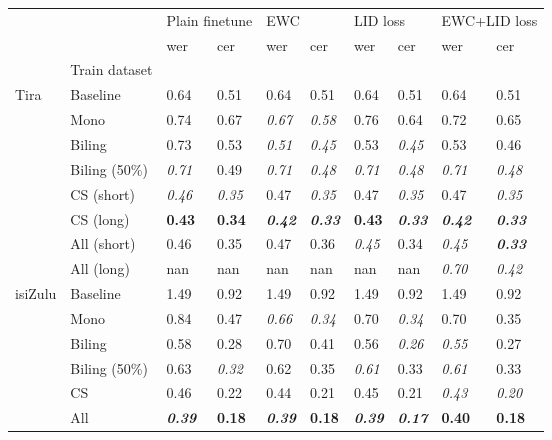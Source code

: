 \begin{tabular}{llllllllll}
\toprule
 &  & \multicolumn{2}{l}{Plain finetune} & \multicolumn{2}{l}{EWC} & \multicolumn{2}{l}{LID loss} & \multicolumn{2}{l}{EWC+LID loss} \\
 &  & wer & cer & wer & cer & wer & cer & wer & cer \\
 & Train dataset &  &  &  &  &  &  &  &  \\
\midrule
Tira & Baseline & 0.64 & 0.51 & 0.64 & 0.51 & 0.64 & 0.51 & 0.64 & 0.51 \\
 & Mono & 0.74 & 0.67 & \textit{0.67} & \textit{0.58} & 0.76 & 0.64 & 0.72 & 0.65 \\
 & Biling & 0.73 & 0.53 & \textit{0.51} & \textit{0.45} & 0.53 & \textit{0.45} & 0.53 & 0.46 \\
 & Biling (50\%) & \textit{0.71} & 0.49 & \textit{0.71} & \textit{0.48} & \textit{0.71} & \textit{0.48} & \textit{0.71} & \textit{0.48} \\
 & CS (short) & \textit{0.46} & \textit{0.35} & 0.47 & \textit{0.35} & 0.47 & \textit{0.35} & 0.47 & \textit{0.35} \\
 & CS (long) & \textbf{0.43} & \textbf{0.34} & \textit{\textbf{0.42}} & \textit{\textbf{0.33}} & \textbf{0.43} & \textit{\textbf{0.33}} & \textit{\textbf{0.42}} & \textit{\textbf{0.33}} \\
 & All (short) & 0.46 & 0.35 & 0.47 & 0.36 & \textit{0.45} & 0.34 & \textit{0.45} & \textit{\textbf{0.33}} \\
 & All (long) & nan & nan & nan & nan & nan & nan & \textit{0.70} & \textit{0.42} \\
\midrule
isiZulu & Baseline & 1.49 & 0.92 & 1.49 & 0.92 & 1.49 & 0.92 & 1.49 & 0.92 \\
 & Mono & 0.84 & 0.47 & \textit{0.66} & \textit{0.34} & 0.70 & \textit{0.34} & 0.70 & 0.35 \\
 & Biling & 0.58 & 0.28 & 0.70 & 0.41 & 0.56 & \textit{0.26} & \textit{0.55} & 0.27 \\
 & Biling (50\%) & 0.63 & \textit{0.32} & 0.62 & 0.35 & \textit{0.61} & 0.33 & \textit{0.61} & 0.33 \\
 & CS & 0.46 & 0.22 & 0.44 & 0.21 & 0.45 & 0.21 & \textit{0.43} & \textit{0.20} \\
 & All & \textit{\textbf{0.39}} & \textbf{0.18} & \textit{\textbf{0.39}} & \textbf{0.18} & \textit{\textbf{0.39}} & \textit{\textbf{0.17}} & \textbf{0.40} & \textbf{0.18} \\
\bottomrule
\end{tabular}
